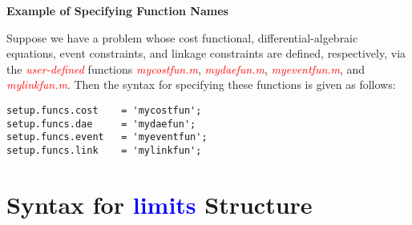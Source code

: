 \documentclass[10pt,final]{report}
\newenvironment{shadedframe}{%
  \def\FrameCommand{\fcolorbox{black}{shadecolor}}%
  \MakeFramed {\FrameRestore}}
{\endMakeFramed}
\newcommand{\bfblue}[1]{\textcolor{blue}{\bf #1}}
\newcommand{\slred}[1]{\textcolor{red}{\sl #1}}
\begin{document}
\begin{shadedframe}

{\noindent}{\bf Example of Specifying Function Names}

\vspace{12pt}

{\noindent}Suppose we have a problem whose cost functional,
differential-algebraic equations, event constraints,
and linkage constraints are defined, respectively, via the
\slred{user-defined} functions \slred{mycostfun.m},
\slred{mydaefun.m}, \slred{myeventfun.m}, and
\slred{mylinkfun.m}.  Then the syntax for specifying these functions is given as follows:
\begin{verbatim}
setup.funcs.cost    = 'mycostfun';
setup.funcs.dae     = 'mydaefun';
setup.funcs.event   = 'myeventfun';
setup.funcs.link    = 'mylinkfun';
\end{verbatim}

\end{shadedframe}


\section{Syntax for \bfblue{limits} Structure \label{sect: limits}}
\end{document}
